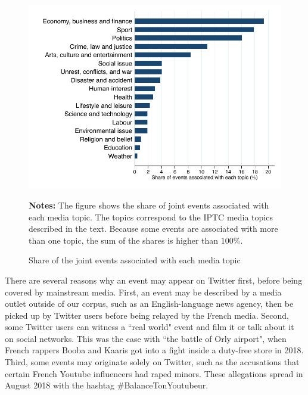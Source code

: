\begin{figure}
\begin{center}
\includegraphics[scale=1]{figures/July/share_topic_event}
\end{center}
	\begin{spacing}{0.5}
{\fns \textbf{Notes:} The figure shows the share of joint events associated with each media topic. The topics correspond to the IPTC media topics described in the text. Because some events are associated with more than one topic, the sum of the shares is higher than $100\%$.}
	\end{spacing}
\vspace{.5cm}		
\caption{Share of the joint events associated with each media topic}
\label{fig:share_topic_event}
\end{figure}



There are several reasons why an event may appear on Twitter first, before being covered by mainstream media. First, an event may be described by a media outlet outside of our corpus, such as an English-language news agency, then be picked up by Twitter users before being relayed by the French media. Second, some Twitter users can witness a ``real world" event and film it or talk about it on social networks. This was the case with ``the battle of Orly airport", when French rappers Booba and Kaaris got into a fight inside a duty-free store in 2018. Third, some events may originate solely on Twitter, such as the accusations that certain French Youtube influencers had raped minors. These allegations spread in August 2018 with the hashtag \#BalanceTonYoutubeur.



